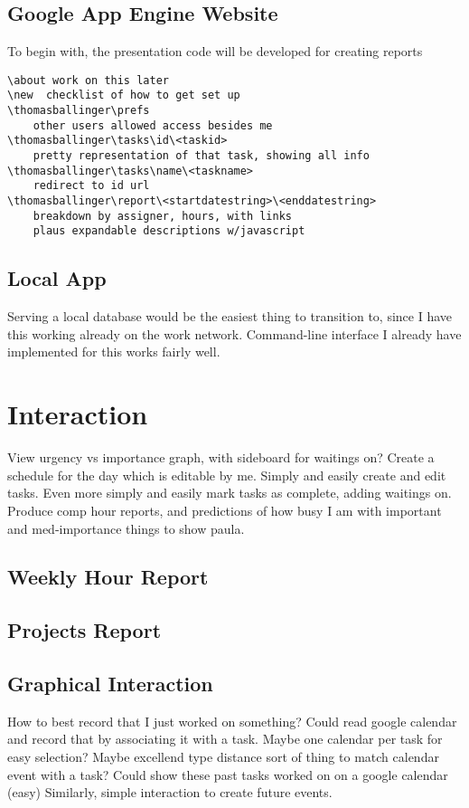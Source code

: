 \documentclass[12pt]{article}
\begin{document}
\subsection{Google App Engine Website}
To begin with, the presentation code will be developed for creating reports

\begin{verbatim}
\about work on this later
\new  checklist of how to get set up
\thomasballinger\prefs
    other users allowed access besides me
\thomasballinger\tasks\id\<taskid>
    pretty representation of that task, showing all info
\thomasballinger\tasks\name\<taskname>
    redirect to id url
\thomasballinger\report\<startdatestring>\<enddatestring>
    breakdown by assigner, hours, with links
    plaus expandable descriptions w/javascript

\end{verbatim}

\subsection{Local App}
Serving a local database would be the easiest thing to transition to, since I have this working
already on the work network.  Command-line interface I already have implemented for this
works fairly well.

\section{Interaction}
View urgency vs importance graph, with sideboard for waitings on?
Create a schedule for the day which is editable by me.
Simply and easily create and edit tasks.
Even more simply and easily mark tasks as complete, adding waitings on. 
Produce comp hour reports, and predictions of how busy I am with 
important and med-importance things to show paula.

\subsection{Weekly Hour Report}

\subsection{Projects Report}

\subsection{Graphical Interaction}
How to best record that I just worked on something?  
Could read google calendar and record that by associating it with a task.
Maybe one calendar per task for easy selection?  Maybe excellend type distance
sort of thing to match calendar event with a task?
Could show these past tasks worked on on a google calendar (easy)
Similarly, simple interaction to create future events.
\end{document}
